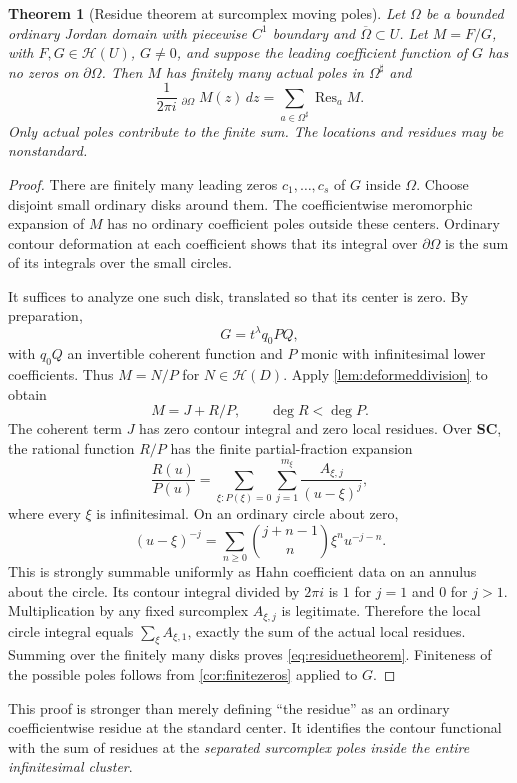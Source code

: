 \documentclass[11pt,letterpaper]{article}
\newtheorem{theorem}{Theorem}[section]
\theoremstyle{definition}
\theoremstyle{remark}
\newcommand{\SC}{\mathbf{SC}}
\newcommand{\HH}{\mathcal H}
\newcommand{\res}{\operatorname{Res}}
\newcommand{\HCoint}{\mathop{\oint^{\!H}}\nolimits}
\newcommand{\sh}{^{\sharp}}
\numberwithin{equation}{section}
\begin{document}
\begin{theorem}[Residue theorem at surcomplex moving poles]\label{thm:residue}
Let $\Omega$ be a bounded ordinary Jordan domain with piecewise $C^1$ boundary and $\overline\Omega\subset U$. Let $M=F/G$, with $F,G\in\HH(U)$, $G\ne0$, and suppose the leading coefficient function of $G$ has no zeros on $\partial\Omega$. Then $M$ has finitely many actual poles in $\Omega\sh$ and
\begin{equation}\label{eq:residuetheorem}
 \frac1{2\pi i}\HCoint_{\partial\Omega}M(z)\,dz
   =\sum_{a\in\Omega\sh}\res_a M.
\end{equation}
Only actual poles contribute to the finite sum. The locations and residues may be nonstandard.
\end{theorem}
\begin{proof}
There are finitely many leading zeros $c_1,\ldots,c_s$ of $G$ inside $\Omega$. Choose disjoint small ordinary disks around them. The coefficientwise meromorphic expansion of $M$ has no ordinary coefficient poles outside these centers. Ordinary contour deformation at each coefficient shows that its integral over $\partial\Omega$ is the sum of its integrals over the small circles.

It suffices to analyze one such disk, translated so that its center is zero. By preparation,
\[
 G=t^\lambda q_0P Q,
\]
with $q_0Q$ an invertible coherent function and $P$ monic with infinitesimal lower coefficients. Thus $M=N/P$ for $N\in\HH(D)$. Apply \cref{lem:deformeddivision} to obtain
\[
 M=J+R/P,\qquad \deg R<\deg P.
\]
The coherent term $J$ has zero contour integral and zero local residues. Over $\SC$, the rational function $R/P$ has the finite partial-fraction expansion
\[
 \frac{R(u)}{P(u)}
 =\sum_{\xi:P(\xi)=0}\sum_{j=1}^{m_\xi}
       \frac{A_{\xi,j}}{(u-\xi)^j},
\]
where every $\xi$ is infinitesimal. On an ordinary circle about zero,
\[
 (u-\xi)^{-j}
 =\sum_{n\ge0}\binom{j+n-1}{n}\xi^n u^{-j-n}.
\]
This is strongly summable uniformly as Hahn coefficient data on an annulus about the circle. Its contour integral divided by $2\pi i$ is $1$ for $j=1$ and $0$ for $j>1$. Multiplication by any fixed surcomplex $A_{\xi,j}$ is legitimate. Therefore the local circle integral equals $\sum_\xi A_{\xi,1}$, exactly the sum of the actual local residues. Summing over the finitely many disks proves \eqref{eq:residuetheorem}. Finiteness of the possible poles follows from \cref{cor:finitezeros} applied to $G$.
\end{proof}
This proof is stronger than merely defining ``the residue'' as an ordinary coefficientwise residue at the standard center. It identifies the contour functional with the sum of residues at the \emph{separated surcomplex poles inside the entire infinitesimal cluster}.
\end{document}
